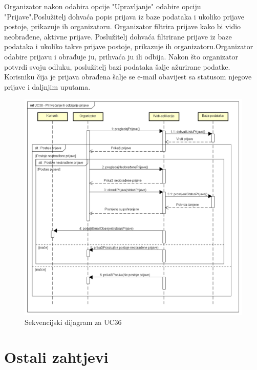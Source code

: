 				\noindent Organizator nakon odabira opcije "Upravljanje" odabire opciju "Prijave".Poslužitelj dohvaća popis prijava iz baze podataka i ukoliko prijave postoje, prikazuje ih organizatoru. Organizator filtrira prijave kako bi vidio neobrađene, aktivne prijave. Poslužitelj dohvaća filtrirane prijave iz baze podataka i ukoliko takve prijave postoje, prikazuje ih organizatoru.Organizator odabire prijavu i obrađuje ju, prihvaća ju ili odbija. Nakon što organizator potvrdi svoju odluku, poslužitelj bazi podataka šalje ažurirane podatke. Korisniku čija je prijava obrađena šalje se e-mail obavijest sa statusom njegove prijave i daljnjim uputama.
				\begin{figure}[H]
					\centerline{\includegraphics[width=\linewidth]{slike/Sekvencijski_dijagram_UC36.png}}
					\caption{Sekvencijski dijagram za UC36}
					\label{fig:sekvencijskiUC36}
				\end{figure}
				\eject
				
			
			
				
				
	
		\section{Ostali zahtjevi}
			 
